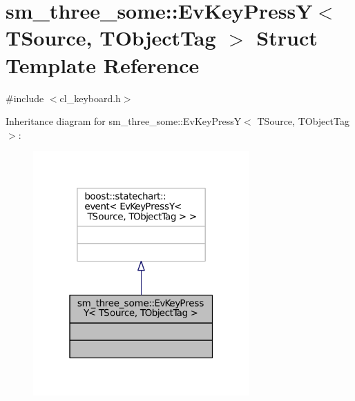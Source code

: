 \hypertarget{structsm__three__some_1_1EvKeyPressY}{}\section{sm\+\_\+three\+\_\+some\+:\+:Ev\+Key\+PressY$<$ T\+Source, T\+Object\+Tag $>$ Struct Template Reference}
\label{structsm__three__some_1_1EvKeyPressY}


{\ttfamily \#include $<$cl\+\_\+keyboard.\+h$>$}



Inheritance diagram for sm\+\_\+three\+\_\+some\+:\+:Ev\+Key\+PressY$<$ T\+Source, T\+Object\+Tag $>$\+:
\nopagebreak
\begin{figure}[H]
\begin{center}
\leavevmode
\includegraphics[width=235pt]{structsm__three__some_1_1EvKeyPressY__inherit__graph}
\end{center}
\end{figure}



